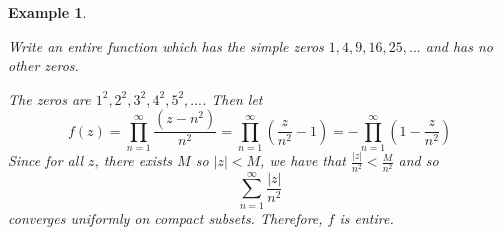\documentclass[12pt]{Qual}
\newtheorem{example}{Example}
\begin{document}
\vspace{0.5cm}
\begin{example}
$\,$
\begin{framed}
Write an entire function which has the simple zeros $1,4,9,16,25,...$ and has no other zeros.
\end{framed}
The zeros are $1^2,2^2,3^2,4^2,5^2,...$. Then let $$f(z)=\prod_{n=1}^\infty\frac{(z-n^2)}{n^2}=\prod_{n=1}^\infty\left(\frac{z}{n^2}-1\right)=-\prod_{n=1}^\infty\left(1-\frac{z}{n^2}\right)$$ Since for all $z$, there exists $M$ so $|z|<M$, we have that $\frac{|z|}{n^2}<\frac{M}{n^2}$ and so $$\sum_{n=1}^\infty\frac{|z|}{n^2}$$ converges uniformly on compact subsets. Therefore, $f$ is entire.
\end{example}
\vspace{0.5cm}
\end{document}
